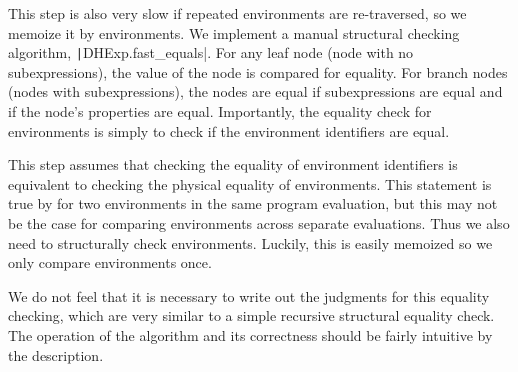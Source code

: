 This step is also very slow if repeated environments are re-traversed, so we memoize it by environments. We implement a manual structural checking algorithm, \texttt|DHExp.fast_equals|. For any leaf node (node with no subexpressions), the value of the node is compared for equality. For branch nodes (nodes with subexpressions), the nodes are equal if subexpressions are equal and if the node's properties are equal. Importantly, the equality check for environments is simply to check if the environment identifiers are equal.

This step assumes that checking the equality of environment identifiers is equivalent to checking the physical equality of environments. This statement is true by  for two environments in the same program evaluation, but this may not be the case for comparing environments across separate evaluations. Thus we also need to structurally check environments. Luckily, this is easily memoized so we only compare environments once.

We do not feel that it is necessary to write out the judgments for this equality checking, which are very similar to a simple recursive structural equality check. The operation of the algorithm and its correctness should be fairly intuitive by the description.

